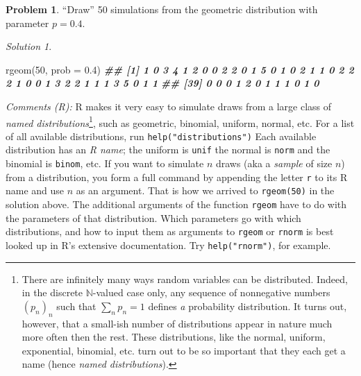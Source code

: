 \documentclass[
]{book}
\newenvironment{Shaded}{\begin{snugshade}}{\end{snugshade}}
\newcommand{\AttributeTok}[1]{\textcolor[rgb]{0.77,0.63,0.00}{#1}}
\newcommand{\DecValTok}[1]{\textcolor[rgb]{0.00,0.00,0.81}{#1}}
\newcommand{\DocumentationTok}[1]{\textcolor[rgb]{0.56,0.35,0.01}{\textbf{\textit{#1}}}}
\newcommand{\FloatTok}[1]{\textcolor[rgb]{0.00,0.00,0.81}{#1}}
\newcommand{\FunctionTok}[1]{\textcolor[rgb]{0.00,0.00,0.00}{#1}}
\newcommand{\NormalTok}[1]{#1}
\theoremstyle{definition}
\theoremstyle{definition}
\theoremstyle{definition}
\newtheorem{exercise}{Problem}[chapter]
\theoremstyle{definition}
\theoremstyle{remark}
\newtheorem*{solution}{Solution}
\begin{document}
\begin{exercise}
``Draw'' 50 simulations from the geometric distribution with parameter \(p=0.4\).
\end{exercise}

\begin{solution}
~

\begin{Shaded}
\begin{Highlighting}[]
\FunctionTok{rgeom}\NormalTok{(}\DecValTok{50}\NormalTok{, }\AttributeTok{prob =} \FloatTok{0.4}\NormalTok{)}
\DocumentationTok{\#\#  [1] 1 0 3 4 1 2 0 0 2 2 0 1 5 0 1 0 2 1 1 0 2 2 2 1 0 0 1 3 2 2 1 1 1 3 5 0 1 1}
\DocumentationTok{\#\# [39] 0 0 0 1 2 0 1 1 1 0 1 0}
\end{Highlighting}
\end{Shaded}

\emph{Comments (R):} R makes it very easy to simulate draws from a large class of \emph{named
distributions}\footnote{There are infinitely many ways random variables can be
  distributed. Indeed, in the discrete \({\mathbb N}\)-valued case only, any
  sequence of nonnegative numbers \((p_n)_n\) such that \(\sum_n p_n=1\) defines
  \emph{a} probability distribution. It turns out, however, that a small-ish number of
  distributions appear in nature much more often then the rest. These
  distributions, like the normal, uniform, exponential, binomial, etc. turn out to
  be so important that they each get a name (hence \emph{named distributions}).},
such as geometric, binomial, uniform, normal, etc. For a list of all available
distributions, run \texttt{help("distributions")} Each available distribution has an \emph{R
name}; the uniform is \texttt{unif} the normal is \texttt{norm} and the binomial is \texttt{binom},
etc. If you want to simulate \(n\) draws (aka a \emph{sample} of size \(n\)) from a
distribution, you form a full command by appending the letter \texttt{r} to its R name
and use \(n\) as an argument. That is how we arrived to \texttt{rgeom(50)} in the
solution above. The additional arguments of the function \texttt{rgeom} have to do with
the parameters of that distribution. Which parameters go with which
distributions, and how to input them as arguments to \texttt{rgeom} or \texttt{rnorm} is best
looked up in R's extensive documentation. Try \texttt{help("rnorm")}, for example.


\end{solution}
\end{document}
